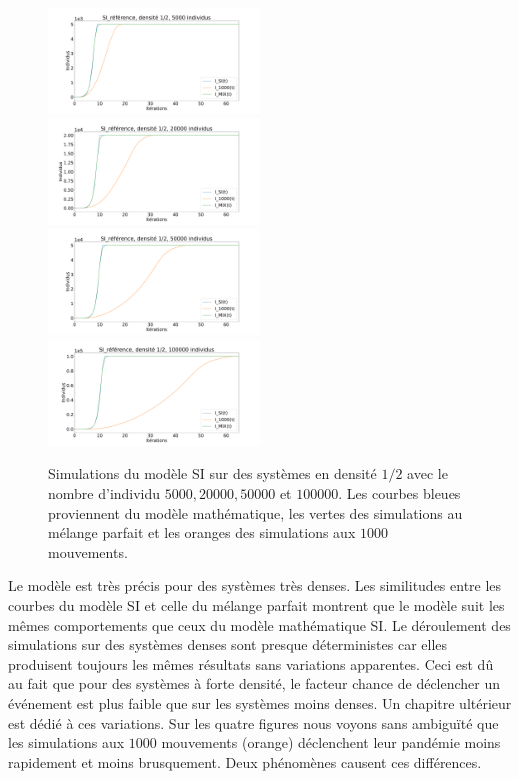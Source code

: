 \begin{figure}
	\centering
	\captionsetup{justification=centering}
	\includegraphics[width=0.5\textwidth]{Images/SI_ref_2_5k.pdf}
	\includegraphics[width=0.5\textwidth]{Images/SI_ref_2_20k.pdf}
	\includegraphics[width=0.5\textwidth]{Images/SI_ref_2_50k.pdf}
	\includegraphics[width=0.5\textwidth]{Images/SI_ref_2_100k.pdf}
	\caption[Simulations de SI, densité 1/2]{Simulations du modèle SI sur des systèmes en densité $1/2$ avec le nombre d'individu $5000,20000,50000$ et $100000$. Les courbes bleues proviennent du modèle mathématique, les vertes des simulations au mélange parfait et les oranges des simulations aux $1000$ mouvements.}
\end{figure}

Le modèle est très précis pour des systèmes très denses. Les similitudes entre les courbes du modèle SI et celle du mélange parfait montrent que le modèle suit les mêmes comportements que ceux du modèle mathématique SI. Le déroulement des simulations sur des systèmes denses sont presque déterministes car elles produisent toujours les mêmes résultats sans variations apparentes. Ceci est dû au fait que pour des systèmes à forte densité, le facteur chance de déclencher un événement est plus faible que sur les systèmes moins denses. Un chapitre ultérieur est dédié à ces variations. Sur les quatre figures nous voyons sans ambiguïté que les simulations aux $1000$ mouvements (orange) déclenchent leur pandémie moins rapidement et moins brusquement. Deux phénomènes causent ces différences. \\

